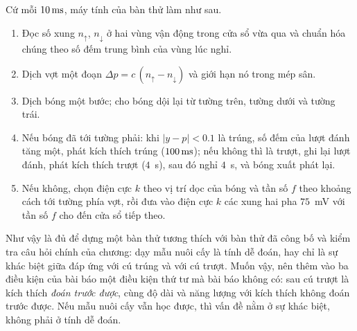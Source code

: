 Cứ mỗi $10\,\text{ms}$, máy tính của bàn thử làm như sau.
\begin{enumerate}
\item Đọc số xung $n_\uparrow$, $n_\downarrow$ ở hai vùng vận động trong cửa sổ vừa qua và chuẩn hóa chúng theo số đếm trung bình của vùng lúc nghỉ.
\item Dịch vợt một đoạn $\Delta p=c\,(n_\uparrow-n_\downarrow)$ và giới hạn nó trong mép sân.
\item Dịch bóng một bước; cho bóng dội lại từ tường trên, tường dưới và tường trái.
\item Nếu bóng đã tới tường phải: khi $|y-p|<0.1$ là trúng, số đếm của lượt đánh tăng một, phát kích thích trúng ($100\,\text{ms}$); nếu không thì là trượt, ghi lại lượt đánh, phát kích thích trượt ($4$~s), sau đó nghỉ $4$~s, và bóng xuất phát lại.
\item Nếu không, chọn điện cực $k$ theo vị trí dọc của bóng và tần số $f$ theo khoảng cách tới tường phía vợt, rồi đưa vào điện cực $k$ các xung hai pha $75$~mV với tần số $f$ cho đến cửa sổ tiếp theo.
\end{enumerate}
Như vậy là đủ để dựng một bàn thử tương thích với bàn thử đã công bố và kiểm tra câu hỏi chính của chương: dạy mẫu nuôi cấy là tính dễ đoán, hay chỉ là sự khác biệt giữa đáp ứng với cú trúng và với cú trượt. Muốn vậy, nên thêm vào ba điều kiện của bài báo một điều kiện thứ tư mà bài báo không có: sau cú trượt là kích thích \emph{đoán trước được}, cùng độ dài và năng lượng với kích thích không đoán trước được. Nếu mẫu nuôi cấy vẫn học được, thì vấn đề nằm ở sự khác biệt, không phải ở tính dễ đoán.
